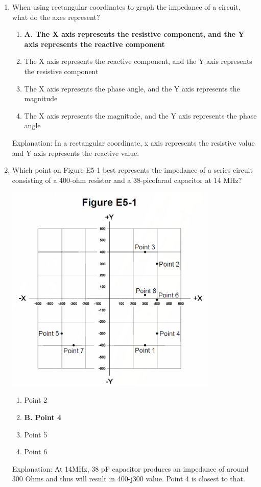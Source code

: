 \begin{enumerate}
    \item When using rectangular coordinates to graph the impedance of a circuit, what do the axes represent?
       \begin{enumerate}
       \item \textbf{A. The X axis represents the resistive component, and the Y axis represents the reactive component}
       \item  The X axis represents the reactive component, and the Y axis represents the resistive component
      \item  The X axis represents the phase angle, and the Y axis represents the magnitude
        \item  The X axis represents the magnitude, and the Y axis represents the phase angle
       \end{enumerate}
     \textcolor{myred}{Explanation:}
    In a rectangular coordinate, x axis represents the resistive value and Y axis represents the reactive value.
    
        
       \item Which point on Figure E5-1 best represents the impedance of a series circuit consisting of a 400-ohm resistor and a 38-picofarad capacitor at 14 MHz? 
           
           \includegraphics[width=0.8\textwidth]{images/e5-1.png}

         \begin{enumerate}
       \item  Point 2
       \item \textbf{B. Point 4}
        \item  Point 5
       \item  Point 6
        \end{enumerate}
      \textcolor{myred}{Explanation:}
       At 14MHz, 38 pF capacitor produces an impedance of around 300 Ohms and thus will result in 400-j300 value. Point 4 is closest to that.


\end{enumerate}
